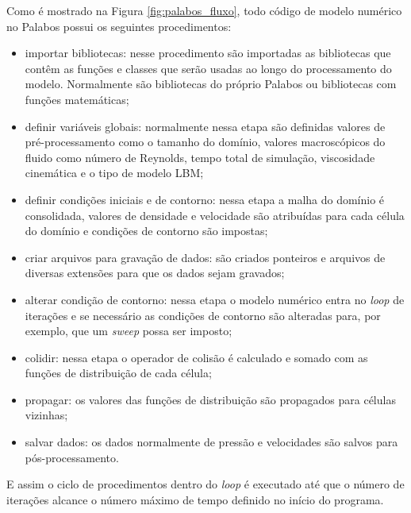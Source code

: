 Como é mostrado na Figura \ref{fig:palabos_fluxo}, todo código de modelo numérico no Palabos possui os seguintes procedimentos:

\begin{itemize}
  \item importar bibliotecas: nesse procedimento são importadas as bibliotecas que contêm as funções e classes que serão usadas ao longo do processamento do modelo. Normalmente são bibliotecas do próprio Palabos ou bibliotecas com funções matemáticas;
  \item definir variáveis globais: normalmente nessa etapa são definidas valores de pré-processamento como o tamanho do domínio, valores macroscópicos do fluido como número de Reynolds, tempo total de simulação, viscosidade cinemática e o tipo de modelo LBM;
  \item definir condições iniciais e de contorno: nessa etapa a malha do domínio é consolidada, valores de densidade e velocidade são atribuídas para cada célula do domínio e condições de contorno são impostas;
  \item criar arquivos para gravação de dados: são criados ponteiros e arquivos de diversas extensões para que os dados sejam gravados;
  \item alterar condição de contorno: nessa etapa o modelo numérico entra no \textit{loop} de iterações e se necessário as condições de contorno são alteradas para, por exemplo, que um \textit{sweep} possa ser imposto;
  \item colidir: nessa etapa o operador de colisão é calculado e somado com as funções de distribuição de cada célula;
  \item propagar: os valores das funções de distribuição são propagados para células vizinhas;
  \item salvar dados: os dados normalmente de pressão e velocidades são salvos para pós-processamento. 
\end{itemize}
E assim o ciclo de procedimentos dentro do \textit{loop} é executado até que o número de iterações alcance o número máximo de tempo definido no início do programa.

